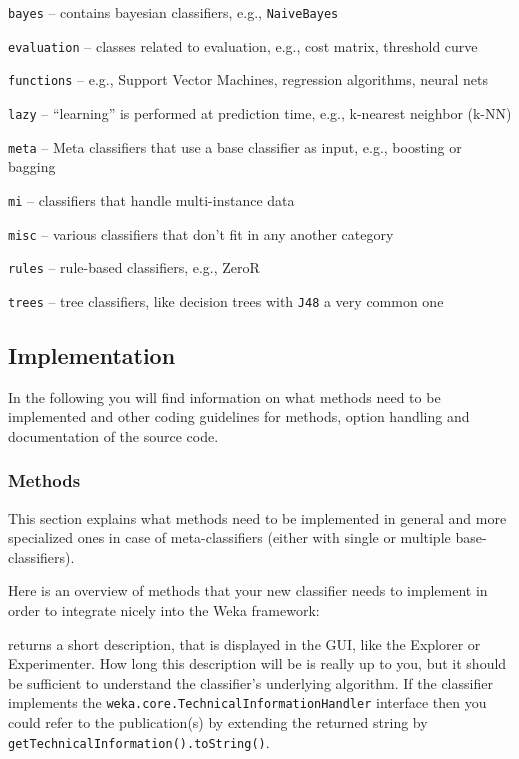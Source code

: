 \begin{tight_itemize}
  \item \texttt{bayes} -- contains bayesian classifiers, e.g.,
\texttt{NaiveBayes}
  \item \texttt{evaluation} -- classes related to evaluation, e.g., cost
matrix, threshold curve
  \item \texttt{functions} -- e.g., Support Vector Machines, regression
algorithms, neural nets
  \item \texttt{lazy} -- ``learning'' is performed at prediction time, e.g.,
k-nearest neighbor (k-NN)
  \item \texttt{meta} -- Meta classifiers that use a base classifier as input,
e.g., boosting or bagging
  \item \texttt{mi} -- classifiers that handle multi-instance data
  \item \texttt{misc} -- various classifiers that don't fit in any another
category
  \item \texttt{rules} -- rule-based classifiers, e.g., ZeroR
  \item \texttt{trees} -- tree classifiers, like decision trees with
\texttt{J48} a very common one
\end{tight_itemize}

\newpage

\subsection{Implementation}
In the following you will find information on what methods need to be
implemented and other coding guidelines for methods, option handling and
documentation of the source code.

\subsubsection{Methods}
This section explains what methods need to be implemented in general and more
specialized ones in case of meta-classifiers (either with single or multiple
base-classifiers).

Here is an overview of methods that your new classifier needs to implement in
order to integrate nicely into the Weka framework:

returns a short description, that is displayed in the
GUI, like the Explorer or Experimenter. How long this description will be is
really up to you, but it should be sufficient to understand the classifier's
underlying algorithm. If the classifier implements the
\texttt{weka.core.TechnicalInformationHandler} interface then you could refer
to the publication(s) by extending the returned string by
\texttt{getTechnicalInformation().toString()}.

